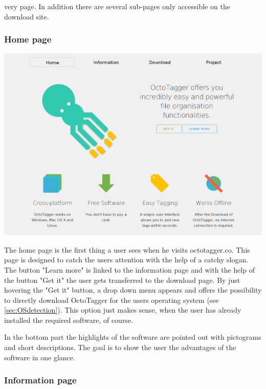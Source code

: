 very page. In addition there are several sub-pages only accessible on the download site.

\subsubsection{Home page}

\begin{center}
\includegraphics[scale=0.35]{images/home_full.png}\\
\end{center}

The home page is the first thing a user sees when he visits octotagger.co. This page is designed to catch the users attention with the help of a catchy slogan. The button "Learn more" is linked to the information page and with the help of the button "Get it" the user gets transferred to the download page. By just hovering the "Get it" button, a drop down menu appears and offers the possibility to directly download OctoTagger for the users operating system (see \ref{sec:OSdetection}). This option just makes sense, when the user has already installed the required software, of course.

In the bottom part the highlights of the software are pointed out with pictograms and short descriptions. The goal is to show the user the advantages of the software in one glance.

\subsubsection{Information page}

